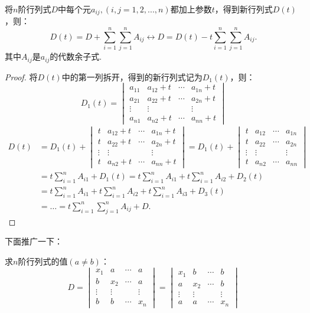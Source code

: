 \begin{theorem}{}{}
    将$n$阶行列式$D$中每个元$a_{ij},(i,j=1,2,...,n)$都加上参数$t$，得到新行列式$D(t)$，则：
    \[D(t)=D+\sum_{i=1}^n\sum_{j=1}^nA_{ij}\leftrightarrow D=D(t)-t\sum_{i=1}^n\sum_{j=1}^nA_{ij}.\]
    其中$A_{ij}$是$a_{ij}$的代数余子式.
\end{theorem}
\begin{proof}{}{}
    将$D(t)$中的第一列拆开，得到的新行列式记为$D_1(t)$，则：
    \[D_1(t)=\begin{vmatrix}a_{11}&a_{12}+t&\cdots&a_{1n}+t\\
        a_{21}&a_{22}+t&\cdots&a_{2n}+t\\
        \vdots&\vdots&&\vdots\\
        a_{n1}&a_{n2}+t&\cdots&a_{nn}+t\end{vmatrix}\]
    \begin{align*}
        D(t)&=D_1(t)+\begin{vmatrix}t&a_{12}+t&\cdots&a_{1n}+t\\
        t&a_{22}+t&\cdots&a_{2n}+t\\\vdots&\vdots&&\vdots\\
        t&a_{n2}+t&\cdots&a_{nn}+t\end{vmatrix}
        =D_1(t)+
        \begin{vmatrix}t&a_{12}&\cdots&a_{1n}\\
            t&a_{22}&\cdots&a_{2n}\\
            \vdots&\vdots&&\vdots\\
            t&a_{n2}&\cdots&a_{nn}\end{vmatrix}\\
        &=t\sum_{i=1}^nA_{i1}+D_1(t)=t\sum_{i=1}^nA_{i1}+t\sum_{i=1}^nA_{i2}+D_2(t)\\
        &=t\sum_{i=1}^nA_{i1}+t\sum_{i=1}^nA_{i2}+t\sum_{i=1}^nA_{i3}+D_3(t)\\
        &=\dots=t\sum_{i=1}^{n}\sum_{j=1}^nA_{ij}+D.
        \end{align*}
\end{proof}
下面推广一下：
\begin{example}{}{}
    求$n$阶行列式的值$(a\ne b)$：
    \[D=\begin{vmatrix}x_1&a&\cdots&a\\b&x_2&\cdots&a\\
        \vdots&\vdots&&\vdots\\b&b&\cdots&x_n\end{vmatrix}=\begin{vmatrix}x_1&b&\cdots&b\\a&x_2&\cdots&b\\
        \vdots&\vdots&&\vdots\\a&a&\cdots&x_n\end{vmatrix}\]
\end{example}
